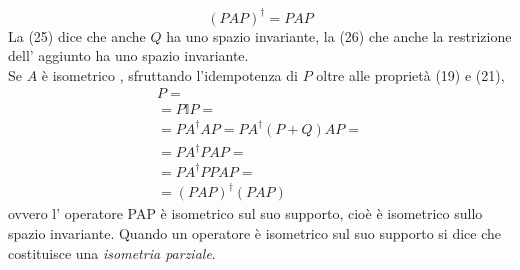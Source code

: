  \begin{equation}
\left(PAP\right)^{\dag}=PAP
 \end{equation}
La (25) dice che anche $Q$ ha uno spazio invariante, la (26) che anche la restrizione dell' aggiunto ha uno spazio invariante. \\
Se $A$  è isometrico , sfruttando l'idempotenza di $P$ oltre alle proprietà (19) e (21), 
 \begin{equation}\begin{split}P=\\=P\mathbb{I}P=\\=PA^{\dag}AP=PA^{\dag}(P+Q)AP=\\=PA^{\dag}PAP=\\=PA^{\dag}PPAP=\\=(PAP)^{\dag}(PAP)
  \end{split}\end{equation}
ovvero l' operatore PAP è isometrico sul suo supporto, cioè è isometrico sullo spazio invariante. Quando un operatore è isometrico sul suo supporto si dice che costituisce una \textit{isometria parziale}.

